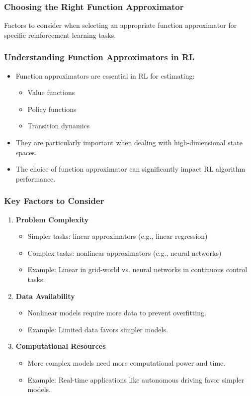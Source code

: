 \documentclass[aspectratio=169]{beamer}
\begin{document}
\begin{frame}
    \frametitle{Choosing the Right Function Approximator}
    Factors to consider when selecting an appropriate function approximator for specific reinforcement learning tasks.
\end{frame}

\begin{frame}
    \frametitle{Understanding Function Approximators in RL}
    \begin{itemize}
        \item Function approximators are essential in RL for estimating:
        \begin{itemize}
            \item Value functions
            \item Policy functions
            \item Transition dynamics
        \end{itemize}
        \item They are particularly important when dealing with high-dimensional state spaces.
        \item The choice of function approximator can significantly impact RL algorithm performance. 
    \end{itemize}
\end{frame}

\begin{frame}
    \frametitle{Key Factors to Consider}
    \begin{enumerate}
        \item \textbf{Problem Complexity}
            \begin{itemize}
                \item Simpler tasks: linear approximators (e.g., linear regression)
                \item Complex tasks: nonlinear approximators (e.g., neural networks)
                \item Example: Linear in grid-world vs. neural networks in continuous control tasks.
            \end{itemize}
        \item \textbf{Data Availability}
            \begin{itemize}
                \item Nonlinear models require more data to prevent overfitting.
                \item Example: Limited data favors simpler models.
            \end{itemize}
        \item \textbf{Computational Resources}
            \begin{itemize}
                \item More complex models need more computational power and time.
                \item Example: Real-time applications like autonomous driving favor simpler models.
            \end{itemize}
    \end{enumerate}
\end{frame}
\end{document}
